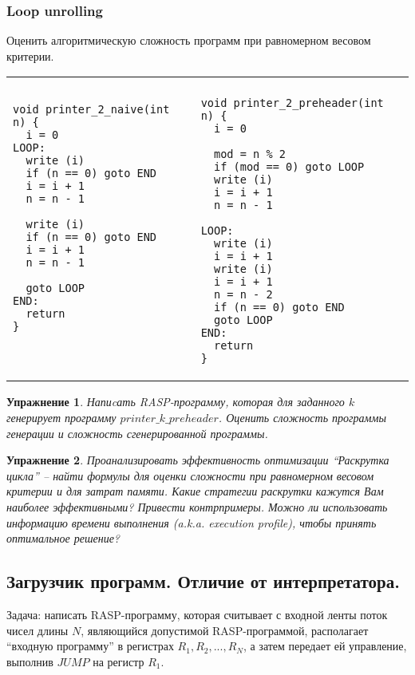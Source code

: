 \documentclass[a4paper, 12pt]{extarticle}
\newtheorem*{homework}{Упражнение}
\begin{document}
\subsubsection*{Loop unrolling}
 Оценить алгоритмическую сложность программ при равномерном весовом критерии.

\begin{tabular}{l|l}
& \\
\begin{minipage}{3in} 
\begin{verbatim}
void printer_2_naive(int n) {
  i = 0
LOOP: 
  write (i)
  if (n == 0) goto END
  i = i + 1
  n = n - 1

  write (i)
  if (n == 0) goto END
  i = i + 1
  n = n - 1

  goto LOOP
END: 
  return 
}   



\end{verbatim}
\end{minipage}
&
\begin{minipage}{3in} 
\begin{verbatim}
void printer_2_preheader(int n) {
  i = 0

  mod = n % 2
  if (mod == 0) goto LOOP  
  write (i)
  i = i + 1
  n = n - 1
     
LOOP: 
  write (i)
  i = i + 1
  write (i)
  i = i + 1  
  n = n - 2
  if (n == 0) goto END  
  goto LOOP
END: 
  return 
}   
\end{verbatim}
\end{minipage}
\end{tabular}

\begin{homework}
 Напиcать RASP-программу, которая для заданного $k$ генерирует программу $printer\_k\_preheader$.
 Оценить сложность программы генерации и сложность сгенерированной программы.
\end{homework}

\begin{homework}
 Проанализировать эффективность оптимизации ``Раскрутка цикла'' -- найти формулы для оценки сложности при равномерном весовом критерии
 и для затрат памяти. Какие стратегии раскрутки кажутся Вам наиболее эффективными? Привести контрпримеры.
 Можно ли использовать информацию времени выполнения (a.k.a. execution profile), чтобы принять оптимальное решение?
\end{homework}

\subsection*{Загрузчик программ. Отличие от интерпретатора.}
Задача: написать RASP-программу, которая считывает с входной ленты поток чисел длины $N$, являющийся допустимой RASP-программой,
располагает ``входную программу'' в регистрах $R_1, R_2, ..., R_N$, а затем передает ей управление, выполнив $JUMP$ на регистр $R_1$.
\end{document}

